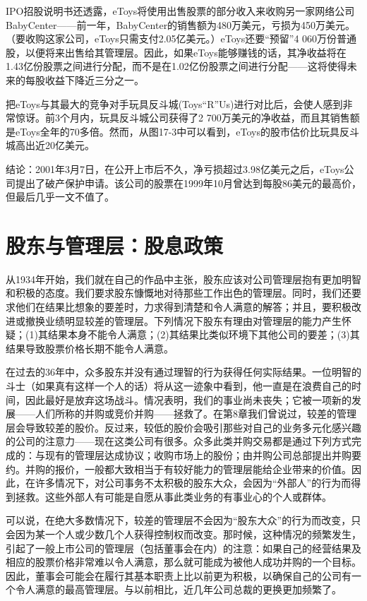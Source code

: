 \documentclass[12pt,oneside]{book}
\begin{document}
IPO招股说明书还透露，eToys将使用出售股票的部分收入来收购另一家网络公司BabyCenter——前一年，BabyCenter的销售额为480万美元，亏损为450万美元。（要收购这家公司，eToys只需支付2.05亿美元。）eToys还要“预留”4 060万份普通股，以便将来出售给其管理层。因此，如果eToys能够赚钱的话，其净收益将在1.43亿份股票之间进行分配，而不是在1.02亿份股票之间进行分配——这将使得未来的每股收益下降近三分之一。

把eToys与其最大的竞争对手玩具反斗城(Toys“R”Us)进行对比后，会使人感到非常惊讶。前3个月内，玩具反斗城公司获得了2 700万美元的净收益，而且其销售额是eToys全年的70多倍。然而，从图17-3中可以看到，eToys的股市估价比玩具反斗城高出近20亿美元。

结论：2001年3月7日，在公开上市后不久，净亏损超过3.98亿美元之后，eToys公司提出了破产保护申请。该公司的股票在1999年10月曾达到每股86美元的最高价，但最后几乎一文不值了。


\section{股东与管理层：股息政策}
从1934年开始，我们就在自己的作品中主张，股东应该对公司管理层抱有更加明智和积极的态度。我们要求股东慷慨地对待那些工作出色的管理层。同时，我们还要求他们在结果比想象的要差时，力求得到清楚和令人满意的解答；并且，要积极改进或撤换业绩明显较差的管理层。下列情况下股东有理由对管理层的能力产生怀疑；(1)其结果本身不能令人满意；(2)其结果比类似环境下其他公司的要差；(3)其结果导致股票价格长期不能令人满意。

在过去的36年中，众多股东并没有通过理智的行为获得任何实际结果。一位明智的斗士（如果真有这样一个人的话）将从这一迹象中看到，他一直是在浪费自己的时间，因此最好是放弃这场战斗。情况表明，我们的事业尚未丧失；它被一项新的发展——人们所称的并购或竞价并购——拯救了。在第8章我们曾说过，较差的管理层会导致较差的股价。反过来，较低的股价会吸引那些对自己的业务多元化感兴趣的公司的注意力——现在这类公司有很多。众多此类并购交易都是通过下列方式完成的：与现有的管理层达成协议；收购市场上的股份；由并购公司总部提出并购要约。并购的报价，一般都大致相当于有较好能力的管理层能给企业带来的价值。因此，在许多情况下，对公司事务不太积极的股东大众，会因为“外部人”的行为而得到拯救。这些外部人有可能是自愿从事此类业务的有事业心的个人或群体。

可以说，在绝大多数情况下，较差的管理层不会因为“股东大众”的行为而改变，只会因为某一个人或少数几个人获得控制权而改变。那时候，这种情况的频繁发生，引起了一般上市公司的管理层（包括董事会在内）的注意：如果自己的经营结果及相应的股票价格非常难以令人满意，那么就可能成为被他人成功并购的一个目标。因此，董事会可能会在履行其基本职责上比以前更为积极，以确保自己的公司有一个令人满意的最高管理层。与以前相比，近几年公司总裁的更换更加频繁了。
\end{document}
